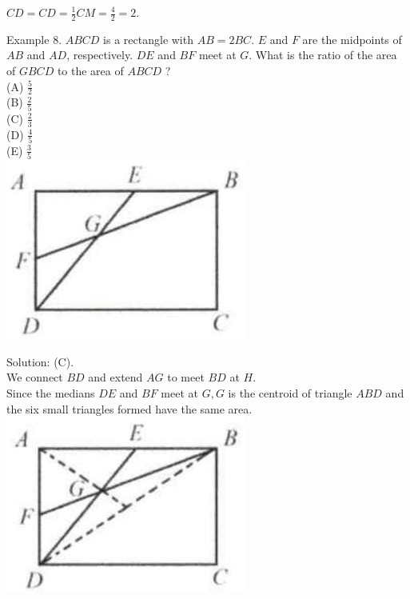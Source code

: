 \documentclass[10pt]{article}
\begin{document}
\(C D=C D=\frac{1}{2} C M=\frac{4}{2}=2\).

Example 8. \(A B C D\) is a rectangle with \(A B=2 B C\). \(E\) and \(F\) are the midpoints of \(A B\) and \(A D\), respectively. \(D E\) and \(B F\) meet at \(G\). What is the ratio of the area of \(G B C D\) to the area of \(A B C D\) ?\\
(A) \(\frac{5}{2}\)\\
(B) \(\frac{2}{5}\)\\
(C) \(\frac{2}{3}\)\\
(D) \(\frac{4}{5}\)\\
(E) \(\frac{3}{5}\)\\
\includegraphics[max width=\textwidth, center]{2025_04_17_97bc1f7e44d93c271a88g-011}

Solution: (C).\\
We connect \(B D\) and extend \(A G\) to meet \(B D\) at \(H\).\\
Since the medians \(D E\) and \(B F\) meet at \(G, G\) is the centroid of triangle \(A B D\) and the six small triangles formed have the same area.\\
\includegraphics[max width=\textwidth, center]{2025_04_17_97bc1f7e44d93c271a88g-011(1)}
\end{document}
